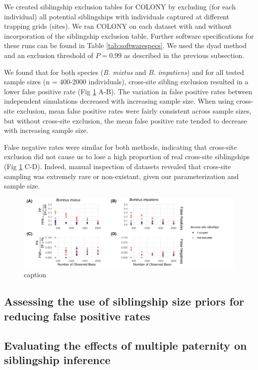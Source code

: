 \documentclass[12pt]{article}
\begin{document}
We created siblingship exclusion tables for COLONY by excluding (for each individual) all potential siblingships with individuals captured at different trapping grids (sites). We ran COLONY on each dataset with and without incorporation of the siblingship exclusion table. Further software specifications for these runs can be found in Table \ref{tab:softwarespecs}. We used the dyad method and an exclusion threshold of $P = 0.99$ as described in the previous subsection.

We found that for both species (\emph{B. mixtus} and \emph{B. impatiens}) and for all tested sample sizes (n = 400-2000 individuals), cross-site sibling exclusion resulted in a lower false positive rate (Fig \ref{fig:excl_size} A-B). The variation in false positive rates between independent simulations decreased with increasing sample size. When using cross-site exclusion, mean false positive rates were fairly consistent across sample sizes, but without cross-site exclusion, the mean false positive rate tended to decrease with increasing sample size.

False negative rates were similar for both methods, indicating that cross-site exclusion did not cause us to lose a high proportion of real cross-site siblingships (Fig \ref{fig:excl_size} C-D). Indeed, manual inspection of datasets revealed that cross-site sampling was extremely rare or non-existant, given our parameterization and sample size.

\begin{figure}[H]
    \centering
    \includegraphics[width=\linewidth]{appendix_figures/excl_size.jpg}
    \caption{caption}
    \label{fig:excl_size}
\end{figure}

\subsection{Assessing the use of siblingship size priors for reducing false positive rates}
\subsection{Evaluating the effects of multiple paternity on siblingship inference}
\end{document}
